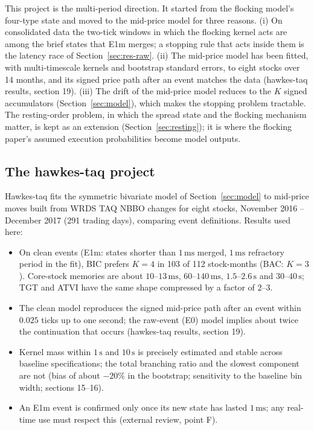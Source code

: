 \documentclass[11pt]{article}
\theoremstyle{definition}
\theoremstyle{remark}
\newcommand{\Eo}{\textsf{E0}}
\newcommand{\Em}{\textsf{E1m}}
\newcommand{\ms}{\,\text{ms}}
\newcommand{\sx}{\,\text{s}}
\begin{document}
This project is the multi-period direction. It started from the flocking model's four-type state and moved to the mid-price model for three reasons. (i) On consolidated data the two-tick windows in which the flocking kernel acts are among the brief states that \Em{} merges; a stopping rule that acts inside them is the latency race of Section~\ref{sec:res-raw}. (ii) The mid-price model has been fitted, with multi-timescale kernels and bootstrap standard errors, to eight stocks over 14 months, and its signed price path after an event matches the data (hawkes-taq results, section 19). (iii) The drift of the mid-price model reduces to the $K$ signed accumulators (Section~\ref{sec:model}), which makes the stopping problem tractable. The resting-order problem, in which the spread state and the flocking mechanism matter, is kept as an extension (Section~\ref{sec:resting}); it is where the flocking paper's assumed execution probabilities become model outputs.

\subsection{The hawkes-taq project}

Hawkes-taq fits the symmetric bivariate model of Section~\ref{sec:model} to mid-price moves built from WRDS TAQ NBBO changes for eight stocks, November 2016 -- December 2017 (291 trading days), comparing event definitions. Results used here:

\begin{itemize}
\item On clean events (\Em: states shorter than $1\ms$ merged, $1\ms$ refractory period in the fit), BIC prefers $K = 4$ in 103 of 112 stock-months (BAC: $K = 3$). Core-stock memories are about $10$--$13\ms$, $60$--$140\ms$, $1.5$--$2.6\sx$ and $30$--$40\sx$; TGT and ATVI have the same shape compressed by a factor of 2--3.
\item The clean model reproduces the signed mid-price path after an event within $0.025$ ticks up to one second; the raw-event (\Eo) model implies about twice the continuation that occurs (hawkes-taq results, section 19).
\item Kernel mass within $1\sx$ and $10\sx$ is precisely estimated and stable across baseline specifications; the total branching ratio and the slowest component are not (bias of about $-20\%$ in the bootstrap; sensitivity to the baseline bin width; sections 15--16).
\item An \Em{} event is confirmed only once its new state has lasted $1\ms$; any real-time use must respect this (external review, point F).
\end{itemize}
\end{document}
